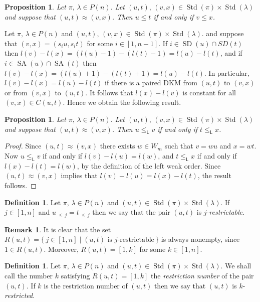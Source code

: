 \documentclass[10pt]{amsart}
\newtheorem{prop}[theo]{Proposition}
\theoremstyle{definition}
\newtheorem{defi}[theo]{Definition}
\newtheorem{rema}[theo]{Remark}
\newcommand{\lside}{_{\mathsf{L}}}
\newcommand{\Lessthan}[2]{#1\,{_{\leqslant\,#2}}}
\DeclareMathOperator{\STD}{Std}
\DeclareMathOperator{\SD}{SD}
\DeclareMathOperator{\SA}{SA}
\begin{document}
\begin{prop}\label{bruhatorderpreserved}
Let $\pi,\,\lambda\in P(n)$. Let $(u,t),\,(v,x)\in \STD(\pi)\times\STD(\lambda)$ and
suppose that $(u,t)\approx (v,x)$. Then $u\leqslant t$ if and only if
$v\leqslant x$.
\end{prop}
Let $\pi,\,\lambda\in P(n)$ and $(u,t),\,(v,x)\in \STD(\pi)\times\STD(\lambda)$.
and suppose that $(v,x) = (s_iu,s_it)$ for some $i\in [1,n-1]$. If
$i\in \SD(u)\cap SD(t)$ then $l(v)-l(x)=(l(u)-1)-(l(t)-1) = l(u)-l(t)$, and
if $i\in \SA(u)\cap\SA(t)$ then $l(v)-l(x)=(l(u)+1)-(l(t)+1) = l(u)-l(t)$.
In particular, $l(v)-l(x)=l(u)-l(t)$ if there is a paired DKM
from $(u,t)$ to $(v,x)$ or from $(v,x)$ to $(u,t)$. It follows
that $l(x)-l(v)$ is constant for all $(v,x)\in C(u,t)$. Hence we
obtain the following result.

\begin{prop}\label{weakorderpreserved}
Let $\pi,\,\lambda\in P(n)$. Let $(u,t),\,(v,x)\in \STD(\pi)\times\STD(\lambda)$ and
suppose that $(u,t)\approx (v,x)$. Then $u\leqslant\lside v$ if and only if
$t\leqslant\lside x$.
\end{prop}
\begin{proof}
Since $(u,t)\approx (v,x)$ there exists $w\in W_m$ such that $v=wu$
and $x=wt$. Now
$u\leqslant\lside v$ if and only if $l(v)-l(u)=l(w)$, and
$t\leqslant\lside x$ if and only if $l(x)-l(t)=l(w)$,
by the definition of the left weak order. Since
$(u,t)\approx (v,x)$ implies that $l(v)-l(u)=l(x)-l(t)$, the result
follows.
\end{proof}

\begin{defi}\label{k-restrictable-ed}
Let $\pi,\,\lambda\in P(n)$ and $(u,t)\in\STD(\pi)\times\STD(\lambda)$.
If $j\in [1,n]$ and $\Lessthan uj=\Lessthan tj$ then we say that the
pair $(u,t)$ is $j$-\emph{restrictable}.
\end{defi}

\begin{rema}\label{k-restrictable-rem}
It is clear that the set
$R(u,t)=\{\,j\in[1,n]\mid (u,t)\text{ is }j\text{-restrictable}\,\}$
is always nonempty, since $1\in R(u,t)$. Moreover, $R(u,t)=[1,k]$ for
some $k\in [1,n]$.
\end{rema}

\begin{defi}\label{restrictedNumber}
Let $\pi,\,\lambda\in P(n)$ and $(u,t)\in\STD(\pi)\times\STD(\lambda)$.
We shall call the number $k$ satisfying $R(u,t)=[1,k]$
the \emph{restriction number} of the pair $(u,t)$. If $k$ is the
restriction number of $(u,t)$ then we say that $(u,t)$ is
$k$-\emph{restricted}.
\end{defi}
\end{document}
